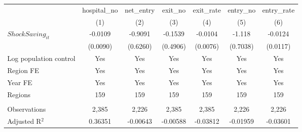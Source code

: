 \begingroup
\centering
\begin{tabular}{lcccccc}
   \toprule
                          & hospital\_no  & net\_entry  & exit\_no  & exit\_rate  & entry\_no  & entry\_rate \\    
                          & (1)           & (2)         & (3)       & (4)         & (5)        & (6)\\  
   \midrule 
   $ShockSaving_{it}$     & -0.0109       & -0.9091     & -0.1539   & -0.0104     & -1.118     & -0.0124\\   
                          & (0.0090)      & (0.6260)    & (0.4906)  & (0.0076)    & (0.7038)   & (0.0117)\\   
   Log population control & Yes           & Yes         & Yes       & Yes         & Yes        & Yes\\  
   Region FE              & Yes           & Yes         & Yes       & Yes         & Yes        & Yes\\  
   Year FE                & Yes           & Yes         & Yes       & Yes         & Yes        & Yes\\  
   Regions                & 159           & 159         & 159       & 159         & 159        & 159\\  
    \\
   Observations           & 2,385         & 2,226       & 2,385     & 2,385       & 2,226      & 2,226\\  
   Adjusted R$^2$         & 0.36351       & -0.00643    & -0.00588  & -0.03812    & -0.01959   & -0.03601\\  
   \bottomrule
\end{tabular}
\par\endgroup
